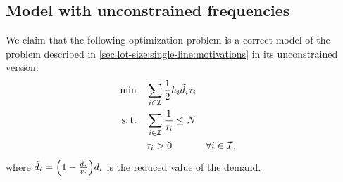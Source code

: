 





\subsection{Model with unconstrained frequencies}
\label{sec:lot-size:single-line:models:unconstraint}



We claim that the following optimization problem is a correct model of the problem described in \cref{sec:lot-size:single-line:motivations} in its unconstrained version:
\begin{subequations}\label{eq:lot-size:single-line:deterministic:unconstraint}
  \begin{align}
  \min\quad & \displaystyle\sum_{i\in\mathcal{I}} \frac{1}{2}h_i\tilde{d}_i\tau_i
  \label{eq:lot-size:single-line:deterministic:unconstraint:objective}
  \\
  \operatorname{s.t.}\quad  & \displaystyle\sum_{i\in\mathcal{I}} \frac{1}{\tau_i} \le N
  \label{eq:lot-size:single-line:deterministic:unconstraint:flexibility}
  \\
       & \tau_i > 0 && \forall i\in\mathcal{I},
  \label{eq:lot-size:single-line:deterministic:unconstraint:positivity}
  \end{align}
\end{subequations}
where $\tilde{\demand}_i=\bracket{1-\frac{\demand_i}{\rate_i}}\demand_i$ is the reduced value of the demand.


